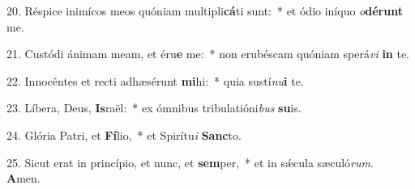 20. Réspice inimícos meos quóniam multipli\textbf{cá}ti sunt:~*  et ódio iníquo \textit{o}\textbf{dé}\textbf{runt} me.\

21. Custódi ánimam meam, et éru\textbf{e} me:~*  non erubéscam quóniam sperá\textit{vi} \textbf{in} te.\

22. Innocéntes et recti adhæsérunt \textbf{mi}hi:~*  quia sustí\textit{nu}\textbf{i} te.\

23. Líbera, Deus, \textbf{Is}raël:~*  ex ómnibus tribulatióni\textit{bus} \textbf{su}is.\

24. Glória Patri, et \textbf{Fí}lio,~*  et Spirítu\textit{i} \textbf{Sanc}to.\

25. Sicut erat in princípio, et nunc, et \textbf{sem}per,~*  et in sǽcula sæculó\textit{rum}. \textbf{A}men.\

